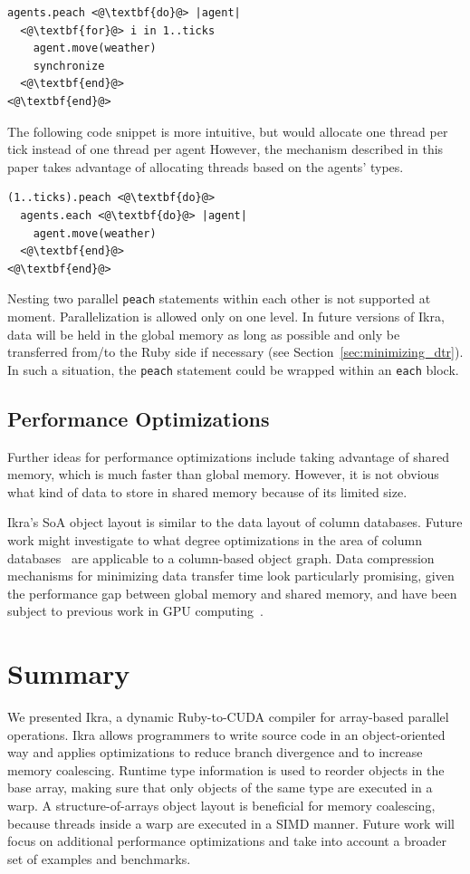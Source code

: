 \documentclass[preprint]{sigplanconf}
\begin{document}
\begin{lstlisting}
agents.peach <@\textbf{do}@> |agent|
  <@\textbf{for}@> i in 1..ticks
    agent.move(weather)
    synchronize
  <@\textbf{end}@>
<@\textbf{end}@>
\end{lstlisting}

The following code snippet is more intuitive, but would allocate one thread per tick instead of one thread per agent However, the mechanism described in this paper takes advantage of allocating threads based on the agents' types.
\begin{lstlisting}
(1..ticks).peach <@\textbf{do}@>
  agents.each <@\textbf{do}@> |agent|
    agent.move(weather)
  <@\textbf{end}@>
<@\textbf{end}@>
\end{lstlisting}

Nesting two parallel \texttt{peach} statements within each other is not supported at moment. Parallelization is allowed only on one level. In future versions of Ikra, data will be held in the global memory as long as possible and only be transferred from/to the Ruby side if necessary (see Section~\ref{sec:minimizing_dtr}). In such a situation, the \texttt{peach} statement could be wrapped within an \texttt{each} block.

\subsection{Performance Optimizations}
Further ideas for performance optimizations include taking advantage of shared memory, which is much faster than global memory. However, it is not obvious what kind of data to store in shared memory because of its limited size.

Ikra's SoA object layout is similar to the data layout of column databases. Future work might investigate to what degree optimizations in the area of column databases~\cite{DBLP:journals/ftdb/AbadiBHIM13, DBLP:journals/corr/LinMPS16} are applicable to a column-based object graph. Data compression mechanisms for minimizing data transfer time look particularly promising, given the performance gap between global memory and shared memory, and have been subject to previous work in GPU computing~\cite{Patel:2012:PLD, Przymus2012}.


\section{Summary}
We presented Ikra, a dynamic Ruby-to-CUDA compiler for array-based parallel operations. Ikra allows programmers to write source code in an object-oriented way and applies optimizations to reduce branch divergence and to increase memory coalescing. Runtime type information is used to reorder objects in the base array, making sure that only objects of the same type are executed in a warp. A structure-of-arrays object layout is beneficial for memory coalescing, because threads inside a warp are executed in a SIMD manner. Future work will focus on additional performance optimizations and take into account a broader set of examples and benchmarks.
\end{document}

